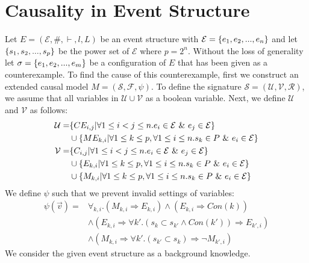 \documentclass{article}
\begin{document}
\section{Causality in Event Structure}
Let $E = (\mathcal{E},\#,\vdash,l,L)$ be an event structure with
$\mathcal{E} = \{e_1, e_2, ...,e_n\}$ and let $\{s_1,s_2,...,s_p\}$ be the power set of $\mathcal{E}$ where $p = 2^n$.
Without the loss of generality let $\sigma = \{e_1,e_2,...,e_m\}$ be a configuration of $E$ that
has been given as a counterexample.
To find the cause of this counterexample, first we construct an extended causal model $M = (\mathcal{S},\mathcal{F},\psi)$.
To define the signature $\mathcal{S} = (\mathcal{U},\mathcal{V},\mathcal{R})$, we assume that all variables in $\mathcal{U} \cup \mathcal{V}$ as a boolean variable.
Next, we define $\mathcal{U}$ and $\mathcal{V}$ as follows:
\begin{align*}
    \mathcal{U} = & \{CE_{i,j} | \forall 1 \leq i < j \leq n. e_i \in \mathcal{E} \ \& \  e_j \in \mathcal{E}\}                    \\
                  & \cup \{ME_{k,i} | \forall 1 \leq k \leq p , \forall 1 \leq i \leq n . s_k \in P \ \& \  e_i \in \mathcal{E} \} \\
    \mathcal{V} = & \{C_{i,j} | \forall 1 \leq i < j \leq n. e_i \in \mathcal{E} \ \& \  e_j \in \mathcal{E}\}                     \\
                  & \cup \{E_{k,i} | \forall 1 \leq k \leq p , \forall 1 \leq i \leq n . s_k \in P \ \& \  e_i \in \mathcal{E} \}  \\
                  & \cup \{M_{k,i} | \forall 1 \leq k \leq p , \forall 1 \leq i \leq n . s_k \in P \ \& \  e_i \in \mathcal{E} \}  \\
\end{align*}
We define $\psi$ such that we prevent invalid settings of variables:
\begin{align*}
    \psi(\vec v) = & \forall_{k,i}.
    \left(
    M_{k,i} \Rightarrow E_{k,i}
    \right)
    \wedge
    \left(
    E_{k,i} \Rightarrow Con(k)
    \right)
    \\
                   & \wedge \left(E_{k,i} \Rightarrow
    \forall k'. (s_k \subset s_{k'} \wedge Con(k')) \Rightarrow E_{k',i}
    \right)                                           \\
                   & \wedge \left(
    M_{k,i} \Rightarrow \forall k'.
    (s_{k'} \subset s_k) \Rightarrow \neg M_{k',i}
    \right)
\end{align*}
We consider the given event structure as a background knowledge.
\end{document}
